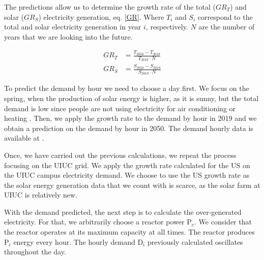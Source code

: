 \documentclass{anstrans}
\begin{document}
The predictions allow us to determine the growth rate of the total ($GR_{T}$) and solar ($GR_{S}$) electricity generation, eq. \ref{GR}. Where $T_i$ and $S_i$ correspond to the total and solar electricity generation in year $i$, respectively. $N$ are the number of years that we are looking into the future.

\begin{equation}
\begin{split}
GR_{T} &= \frac{T_{2050}-T_{2019}} {T_{2019} \cdot N }
\\
GR_{S} &= \frac{S_{2050}-S_{2019}} {S_{2019} \cdot N }
\end{split}
\label{GR}
\end{equation}

To predict the demand by hour we need to choose a day first.
We focus on the spring, when the production of solar energy is higher, as it is sunny, but the total demand is low since people are not using electricity for air conditioning or heating \cite{us_department_of_energy_confronting_2017}.
Then, we apply the growth rate to the demand by hour in 2019 and we obtain a prediction on the demand by hour in 2050.
The demand hourly data is available at \cite{eia_united_2020}.

Once, we have carried out the previous calculations, we repeat the process focusing on the \gls{UIUC} grid.
We apply the growth rate calculated for the \gls{US} on the \gls{UIUC} campus electricity demand.
We choose to use the \gls{US} growth rate as the solar energy generation data that we count with is scarce, as the solar farm at \gls{UIUC} is relatively new.

With the demand predicted, the next step is to calculate the over-generated electricity. For that, we arbitrarily choose a reactor power P$_e$. We consider that the reactor operates at its maximum capacity at all times. The reactor produces P$_i$ energy every hour. The hourly demand D$_i$ previously calculated oscillates throughout the day.



\end{document}
